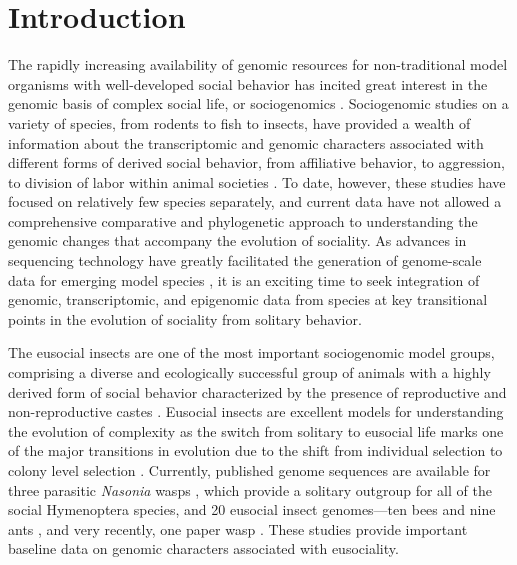 \section{Introduction}

The rapidly increasing availability of genomic resources for
non-traditional model organisms with well-developed social behavior has
incited great interest in the genomic basis of complex social life, or
sociogenomics \cite{Robinson2005}. Sociogenomic studies on a variety of species, from rodents
to fish to insects, have provided a wealth of information about the
transcriptomic and genomic characters associated with different forms of
derived social behavior, from affiliative behavior, to aggression, to
division of labor within animal societies
\cite{Robinson2008}. To
date, however, these studies have focused on relatively few species
separately, and current data have not allowed a comprehensive
comparative and phylogenetic approach to understanding the genomic
changes that accompany the evolution of sociality. As advances in
sequencing technology have greatly facilitated the generation of
genome-scale data for emerging model species \cite{Rokas2009}, it is an
exciting time to seek integration of genomic, transcriptomic, and
epigenomic data from species at key transitional points in the evolution
of sociality from solitary behavior.

The eusocial insects are one of the most important sociogenomic model
groups, comprising a diverse and ecologically successful group of
animals with a highly derived form of social behavior characterized by
the presence of reproductive and non-reproductive castes \cite{Superorganism}.
Eusocial insects are excellent models for understanding the evolution of
complexity as the switch from solitary to eusocial life marks one of the
major transitions in evolution due to the shift from individual
selection to colony level selection
\cite{MaynardSmith1995}.
Currently, published genome sequences are available for three parasitic
\textit{Nasonia} wasps \cite{Werren2010}, which provide a solitary outgroup for all of the
social Hymenoptera species, and 20 eusocial insect genomes---ten bees
\cite{KapheimTenBee,Kocher2013,Sadd2015,HoneybeeGenome} and
nine ants \cite{Bonasio2010,Nygaard2011,Oxley2014,LhumGenome,PbarGenome,AcepGenome,SinvGenome}, and very
recently, one paper wasp \cite{PcanGenome}. These studies provide important baseline data on
genomic characters associated with eusociality.

